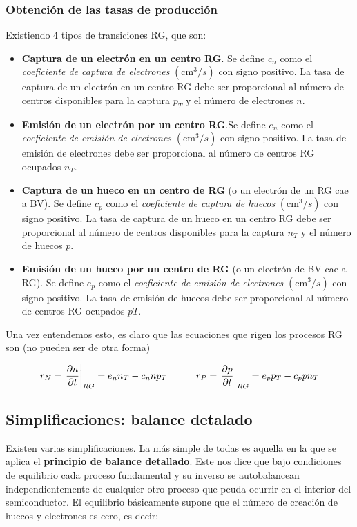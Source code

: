 \subsubsection{Obtención de las tasas de producción}

Existiendo 4 tipos de transiciones RG, que son:

\begin{itemize}
	\item \textbf{Captura de un electrón en un centro RG}. Se define $c_n$ como el \textit{coeficiente de captura de electrones} $(\text{cm}^3/s)$ con signo positivo. La tasa de captura de un electrón en un centro RG debe ser proporcional al número de centros disponibles para la captura $p_T$ y el número de electrones $n$.
	\item \textbf{Emisión de un electrón por un centro RG}.Se define $e_n$ como el \textit{coeficiente de emisión de electrones} $(\text{cm}^3/s)$ con signo positivo. La tasa de emisión de electrones debe ser proporcional al número de centros RG ocupados $n_T$.
	\item \textbf{Captura de un hueco en un centro de RG} (o un electrón de un RG cae a BV). Se define $c_p$ como el \textit{coeficiente de captura de huecos} $(\text{cm}^3/s)$ con signo positivo. La tasa de captura de un hueco en un centro RG debe ser proporcional al número de centros disponibles para la captura $n_T$ y el número de huecos $p$.
	\item \textbf{Emisión de un hueco por un centro de RG} (o un electrón de BV cae a RG). Se define $e_p$ como el \textit{coeficiente de emisión de electrones} $(\text{cm}^3/s)$ con signo positivo. La tasa de emisión de huecos debe ser proporcional al número de centros RG ocupados $pT$.
\end{itemize}
Una vez entendemos esto, es claro que las ecuaciones que rigen los procesos RG son (no pueden ser de otra forma)

\begin{equation}
	r_N = \eval{\parciales{n}{t}}_{RG} = e_n n_T - c_n n p_T \tquad r_P = 	\eval{\parciales{p}{t}}_{RG} = e_pp_T - c_p p n_T
\end{equation}

\subsection{Simplificaciones: balance detalado}

Existen varias simplificaciones. La más simple de todas es aquella en la que se aplica el \textbf{principio de balance detallado}. Este nos dice que bajo condiciones de equilibrio cada proceso fundamental y su inverso se autobalancean independientemente de cualquier otro proceso que peuda ocurrir en el interior del semiconductor. El equilibrio básicamente supone que el número de creación de huecos y electrones es cero, es decir:


